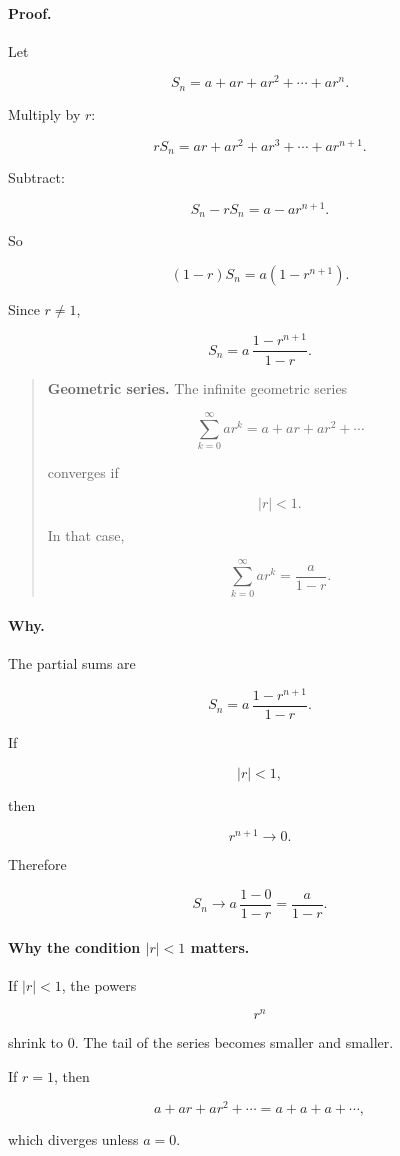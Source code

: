 \paragraph{Proof.}
Let

\[
S_n=a+ar+ar^2+\cdots+ar^n.
\]

Multiply by \(r\):

\[
rS_n=ar+ar^2+ar^3+\cdots+ar^{n+1}.
\]

Subtract:

\[
S_n-rS_n
=
a-ar^{n+1}.
\]

So

\[
(1-r)S_n=a(1-r^{n+1}).
\]

Since \(r\neq1\),

\[
S_n=a\,\frac{1-r^{n+1}}{1-r}.
\]

\begin{quote}
\textbf{Geometric series.}
The infinite geometric series

\[
\sum_{k=0}^{\infty}ar^k
=
a+ar+ar^2+\cdots
\]

converges if

\[
|r|<1.
\]

In that case,

\[
\boxed{
\sum_{k=0}^{\infty}ar^k=\frac{a}{1-r}.
}
\]
\end{quote}

\paragraph{Why.}
The partial sums are

\[
S_n=a\,\frac{1-r^{n+1}}{1-r}.
\]

If

\[
|r|<1,
\]

then

\[
r^{n+1}\to0.
\]

Therefore

\[
S_n\to a\,\frac{1-0}{1-r}
=
\frac{a}{1-r}.
\]

\paragraph{Why the condition \(|r|<1\) matters.}
If \(|r|<1\), the powers

\[
r^n
\]

shrink to \(0\).  The tail of the series becomes smaller and smaller.

If \(r=1\), then

\[
a+ar+ar^2+\cdots=a+a+a+\cdots,
\]

which diverges unless \(a=0\).


